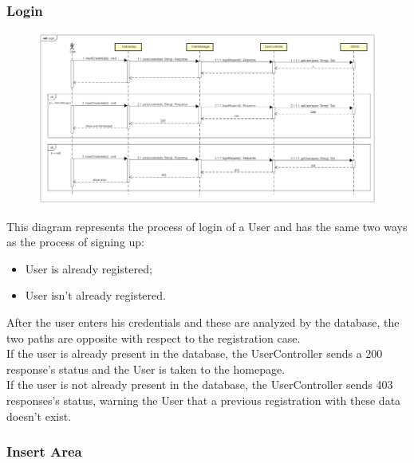 \newpage
\subsubsection{Login}

\begin{figure}[H]
    \begin{center}
        \includegraphics[width=\textwidth]{Images/SequenceDiagrams/LoginDD.png}
    \end{center}
\end{figure}

This diagram represents the process of login of a User and has the same two ways as the process of signing up:
\begin{itemize}
    \item User is already registered;
    \item User isn't already registered.
\end{itemize}
After the user enters his credentials and these are analyzed by the database, 
the two paths are opposite with respect to the registration case.\\
If the user is already present in the database, the UserController sends a 
200 response's status and the User is taken to the homepage.\\
If the user is not already present in the database, the UserController sends 403 responses's status, 
warning the User that a previous registration with these data doesn't exist.


\newpage
\subsubsection{Insert Area}

